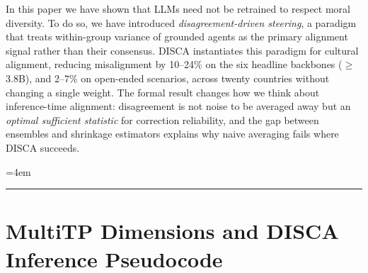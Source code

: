 \documentclass{article}
\begin{document}
In this paper we have shown that LLMs need not be retrained to respect moral diversity. To do so, we have introduced \emph{disagreement-driven steering}, a paradigm that treats within-group variance of grounded agents as the primary alignment signal rather than their consensus. 
DISCA instantiates this paradigm for cultural alignment, reducing misalignment by 10--24\% on the six headline backbones ($\geq$3.8B), and 2--7\% on open-ended scenarios, across twenty countries without changing a single weight. The formal result changes how we think about inference-time alignment: disagreement is not noise to be averaged away but an \emph{optimal sufficient statistic} for correction reliability, and the gap between ensembles and shrinkage estimators explains why naive averaging fails where DISCA succeeds. 

{\sloppy
\emergencystretch=4em


}

\newpage
\appendix
\setcounter{section}{0}
\renewcommand{\thesection}{A\arabic{section}}

\startcontents[appendix]
\vspace{0.5em}
\hrule
\vspace{1em}
\newpage

\section{MultiTP Dimensions and DISCA Inference Pseudocode}
\label{app:disca_overview}
\end{document}
